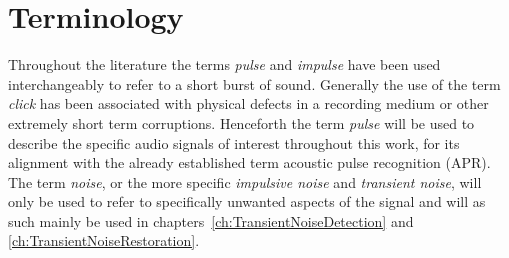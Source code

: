 %


\section{Terminology}
Throughout the literature the terms \emph{pulse}\cite{Esquef2002a}\cite{Esquef2003a} and \emph{impulse}\cite{Czyzewski1995}\cite{Kauppinen2002a}\cite{Chen2000} have been used interchangeably to refer to a short burst of sound. Generally the use of the term \emph{click}\cite{Czyzewski1995}\cite{Esquef2002}\cite{Godsill1998book} has been associated with physical defects in a recording medium or other extremely short term corruptions. Henceforth the term \emph{pulse} will be used to describe the specific audio signals of interest throughout this work, for its alignment with the already established term acoustic pulse recognition (APR)\cite{TouchSystems2006}. The term \emph{noise}, or the more specific \emph{impulsive noise} and \emph{transient noise}, will only be used to refer to specifically unwanted aspects of the signal and will as such mainly be used in chapters~\ref{ch:TransientNoiseDetection} and \ref{ch:TransientNoiseRestoration}.

